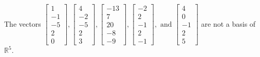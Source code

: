 \begin{exercise}
\begin{exerciseStatement}
  \end{exerciseStatement}
  \begin{exerciseAnswer}
   The vectors \(\left[\begin{array}{r}
1 \\
-1 \\
-5 \\
2 \\
0
\end{array}\right] , \left[\begin{array}{r}
4 \\
-2 \\
-5 \\
2 \\
3
\end{array}\right] , \left[\begin{array}{r}
-13 \\
7 \\
20 \\
-8 \\
-9
\end{array}\right] , \left[\begin{array}{r}
-2 \\
2 \\
-1 \\
2 \\
-1
\end{array}\right] , \text{ and } \left[\begin{array}{r}
4 \\
0 \\
-1 \\
2 \\
5
\end{array}\right]\) 
  	 are not  a basis of \(\mathbb{R}^5\).
  


  \end{exerciseAnswer}
\end{exercise}